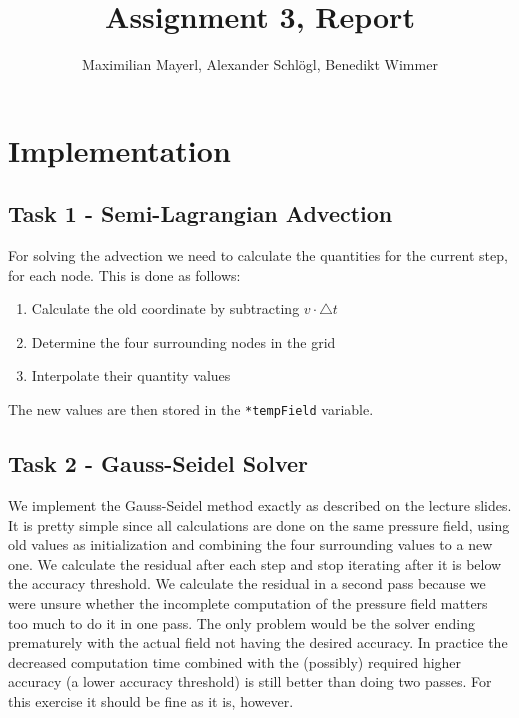 \documentclass[11pt]{article}
\author{Maximilian Mayerl, Alexander Schl\"ogl, Benedikt Wimmer}
\title{Assignment 3, Report}
\begin{document}
\maketitle



    
\section{Implementation}\label{implementation}



\subsection{Task 1 - Semi-Lagrangian Advection}\label{forward-euler}

For solving the advection we need to calculate the quantities for the current step, for each node. This is done as follows:

\begin{enumerate}
	\item Calculate the old coordinate by subtracting $v\cdot \triangle t$
	\item Determine the four surrounding nodes in the grid
	\item Interpolate their quantity values
\end{enumerate}

\noindent The new values are then stored in the \texttt{*tempField} variable.

\subsection{Task 2 - Gauss-Seidel Solver}

We implement the Gauss-Seidel method exactly as described on the lecture slides. It is pretty simple since all calculations are done on the same pressure field, using old values as initialization and combining the four surrounding values to a new one. We calculate the residual after each step and stop iterating after it is below the accuracy threshold.
We calculate the residual in a second pass because we were unsure whether the incomplete computation of the pressure field matters too much to do it in one pass.
The only problem would be the solver ending prematurely with the actual field not having the desired accuracy.
In practice the decreased computation time combined with the (possibly) required higher accuracy (a lower accuracy threshold) is still better than doing two passes.
For this exercise it should be fine as it is, however.
\end{document}
